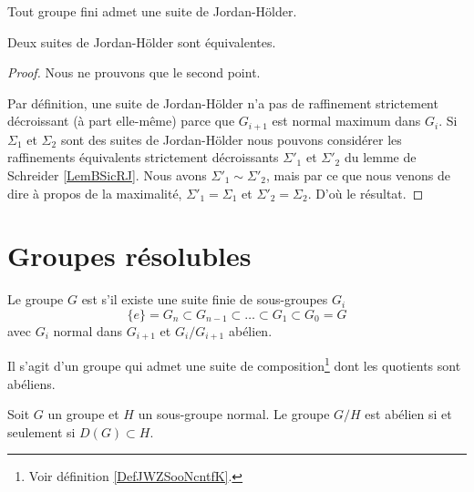 \begin{theorem}\label{ThoLgxWIC}
    Tout groupe fini admet une suite de Jordan-Hölder.

    Deux suites de Jordan-Hölder sont équivalentes.
\end{theorem}

\begin{proof}
    Nous ne prouvons que le second point.

    Par définition, une suite de Jordan-Hölder n'a pas de raffinement strictement décroissant (à part elle-même) parce que \( G_{i+1}\) est normal maximum dans \( G_i\). Si \( \Sigma_1\) et \( \Sigma_2\) sont des suites de Jordan-Hölder nous pouvons considérer les raffinements équivalents strictement décroissants \( \Sigma'_1\) et \( \Sigma'_2\) du lemme de Schreider \ref{LemBSicRJ}. Nous avons \( \Sigma'_1\sim\Sigma'_2\), mais par ce que nous venons de dire à propos de la maximalité, \( \Sigma'_1=\Sigma_1\) et \( \Sigma'_2=\Sigma_2\). D'où le résultat.
\end{proof}

\section{Groupes résolubles}

\begin{definition}  \label{DefOSYNooTROIKs}
    Le groupe \( G\) est  s'il existe une suite finie de sous-groupes \( G_i\)
    \begin{equation}
        \{ e \}=G_n\subset G_{n-1}\subset\ldots\subset G_1\subset G_0=G
    \end{equation}
    avec \( G_i\) normal dans \( G_{i+1}\) et \( G_i/G_{i+1}\) abélien.
\end{definition}
Il s'agit d'un groupe qui admet une suite de composition\footnote{Voir définition \ref{DefJWZSooNcntfK}.} dont les quotients sont abéliens.

\begin{lemma}   \label{LemOARMooYhYmbH}
    Soit \( G\) un groupe et \( H\) un sous-groupe normal. Le groupe \( G/H\) est abélien si et seulement si \( D(G)\subset H\).
\end{lemma}

